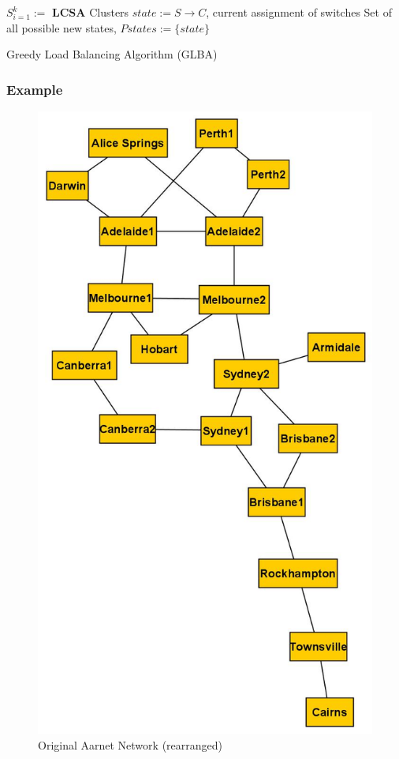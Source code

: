 \documentclass[a4paper,fleqn]{cas-dc}
\begin{document}
\begin{algorithm}
	\SetAlgoLined
	$S_{i=1}^k := $ \textbf{LCSA} Clusters\;
	$state := S \rightarrow C$, current assignment of switches\;
	Set of all possible new states, $Pstates := \{state\}$\;
	\caption{Greedy Load Balancing Algorithm (GLBA)} \label{algo:glba}
\end{algorithm}

\subsubsection{Example}

\begin{figure}
	\centering
	\includegraphics[width=0.65\linewidth]{Images/Aarnet_Graph.jpg}
	\caption{Original Aarnet Network (rearranged)}
	\label{fig:aarnet2009}
\end{figure}
\end{document}

